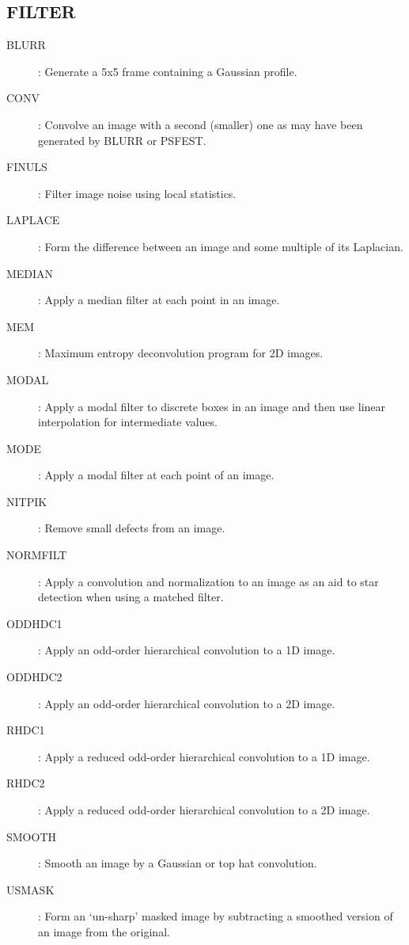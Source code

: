 \subsection {FILTER}
\begin{description}
\begin{description}
\item [BLURR]: Generate a 5x5 frame containing a Gaussian profile.
\item [CONV]: Convolve an image with a second (smaller) one as may have been
generated by BLURR or PSFEST.
\item [FINULS]: Filter image noise using local statistics.
\item [LAPLACE]: Form the difference between an image and some multiple of its
Laplacian.
\item [MEDIAN]: Apply a median filter at each point in an image.
\item [MEM]: Maximum entropy deconvolution program for 2D images.
\item [MODAL]: Apply a modal filter to discrete boxes in an image and then use
linear interpolation for intermediate values.
\item [MODE]: Apply a modal filter at each point of an image.
\item [NITPIK]: Remove small defects from an image.
\item [NORMFILT]: Apply a convolution and normalization to an image as an aid to
star detection when using a matched filter.
\item [ODDHDC1]: Apply an odd-order hierarchical convolution to a 1D image.
\item [ODDHDC2]: Apply an odd-order hierarchical convolution to a 2D image.
\item [RHDC1]: Apply a reduced odd-order hierarchical convolution to a 1D
image.
\item [RHDC2]: Apply a reduced odd-order hierarchical convolution to a 2D
image.
\item [SMOOTH]: Smooth an image by a Gaussian or top hat convolution.
\item [USMASK]: Form an `un-sharp' masked image by subtracting a smoothed
version of an image from the original.
\end{description}
\end{description}
